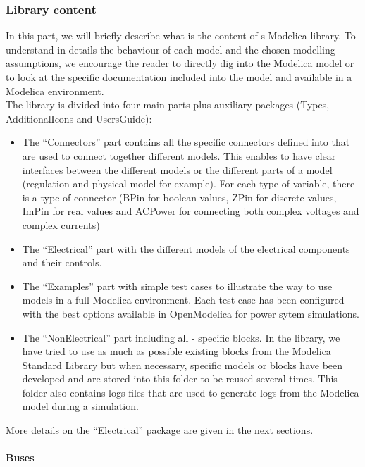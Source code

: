 \documentclass[a4paper, 12pt]{report}
\begin{document}
\subsubsection{Library content}

In this part, we will briefly describe what is the content of \Dynawo\textquotesingle s Modelica library. To understand in details the behaviour of each model and the chosen modelling assumptions, we encourage the reader to directly dig into the Modelica  model or to look at the specific documentation included into the model and available in a Modelica environment.\\

The \Dynawo library is divided into four main parts plus auxiliary packages (Types, AdditionalIcons and UsersGuide):
\begin{itemize}
\item The ``Connectors'' part contains all the specific connectors defined into \Dynawo that are used to connect together different models. This enables to have clear interfaces between the different models or the different parts of a model (regulation and physical model for example). For each type of variable, there is a type of connector (BPin for boolean values, ZPin for discrete values, ImPin for real values and ACPower for connecting both complex voltages and complex currents)
\item The ``Electrical'' part with the different models of the electrical components and their controls.
\item The ``Examples'' part with simple test cases to illustrate the way to use \Dynawo models in a full Modelica environment. Each test case has been configured with the best options available in OpenModelica for power sytem simulations.
\item The ``NonElectrical'' part including all \Dynawo - specific blocks. In the library, we have tried to use as much as possible existing blocks from the Modelica Standard Library but when necessary, specific models or blocks have been developed and are stored into this folder to be reused several times. This folder also contains logs files that are used to generate logs from the Modelica model during a simulation.
\end{itemize}

More details on the ``Electrical'' package are given in the next sections.

\paragraph{Buses}
~~\\
\end{document}
